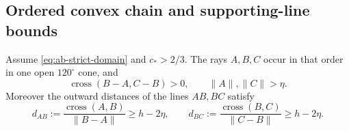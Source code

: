 \subsection{Ordered convex chain and supporting-line bounds}

\begin{proposition}
\label{prop:technical-four-contact-geometry}
Assume \eqref{eq:ab-strict-domain} and $c_*>2/3$. The rays $A,B,C$ occur
in that order in one open $120^\circ$ cone, and
\[
 \operatorname{cross}(B-A,C-B)>0,\qquad
 \|A\|,\|C\|>\eta.
\]
Moreover the outward distances of the lines $AB,BC$ satisfy
\begin{equation}
 d_{AB}:=\frac{\operatorname{cross}(A,B)}{\|B-A\|}\ge h-2\eta,\qquad
 d_{BC}:=\frac{\operatorname{cross}(B,C)}{\|C-B\|}\ge h-2\eta.
 \label{eq:adjacent-overlaps}
\end{equation}
\end{proposition}

